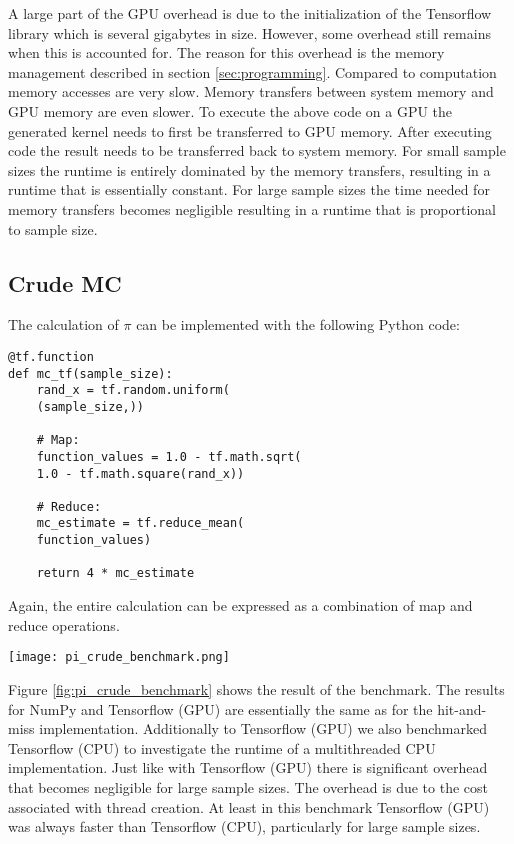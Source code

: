 A large part of the GPU overhead is due to the initialization of the Tensorflow library which is several gigabytes in size.
However, some overhead still remains when this is accounted for.
The reason for this overhead is the memory management described in section \ref{sec:programming}.
Compared to computation memory accesses are very slow.
Memory transfers between system memory and GPU memory are even slower.
To execute the above code on a GPU the generated kernel needs to first be transferred to GPU memory.
After executing code the result needs to be transferred back to system memory.
For small sample sizes the runtime is entirely dominated by the memory transfers,
resulting in a runtime that is essentially constant.
For large sample sizes the time needed for memory transfers becomes negligible resulting in a
runtime that is proportional to sample size.
\subsection{Crude MC}
The calculation of $\pi$ can be implemented with the following Python code:
\begin{lstlisting}
@tf.function
def mc_tf(sample_size):
    rand_x = tf.random.uniform(
	(sample_size,))

    # Map:
    function_values = 1.0 - tf.math.sqrt(
	1.0 - tf.math.square(rand_x))

    # Reduce:
    mc_estimate = tf.reduce_mean(
	function_values)

    return 4 * mc_estimate
\end{lstlisting}
Again, the entire calculation can be expressed as a combination of map and reduce operations.
\begin{figure*}
	\texttt{[image: pi\_crude\_benchmark.png]}
	\caption{
		Benchmark of crude MC.
		Runtime with NumPy is proportional to sample size.
		Runtime with Tensorflow (GPU) is constant for $N <= 10^7$.
		Runtime with Tensorflow (CPU and GPU) is proportional to sample size for $N >= 10^9$
		(assuming Tensorflow is already initialized).
	}
	\label{fig:pi_crude_benchmark}
\end{figure*}
Figure \ref{fig:pi_crude_benchmark} shows the result of the benchmark.
The results for NumPy and Tensorflow (GPU) are essentially the same as for the hit-and-miss implementation.
Additionally to Tensorflow (GPU) we also benchmarked Tensorflow (CPU) to investigate the runtime
of a multithreaded CPU implementation.
Just like with Tensorflow (GPU) there is significant overhead that becomes negligible for large sample sizes.
The overhead is due to the cost associated with thread creation.
At least in this benchmark Tensorflow (GPU) was always faster than Tensorflow (CPU), particularly for large sample sizes.
